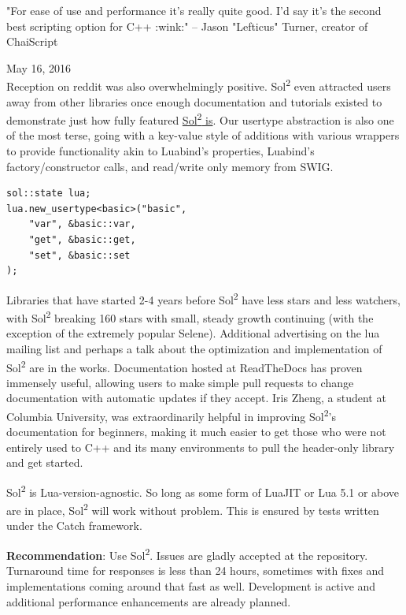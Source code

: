 \documentclass[conference,compsoc]{IEEEtran}
\newcommand{\soltwo}{Sol\textsuperscript{2}}
\begin{document}
\hfill "For ease of use and performance it's really quite good. I'd say it's the second best scripting option for C++ :wink:" -- Jason "Lefticus" Turner, creator of ChaiScript

\hfill May 16, 2016 \\

Reception on reddit was also overwhelmingly positive\cite{sol2-reddit}. \soltwo{} even attracted users away from other libraries once enough documentation and tutorials existed to demonstrate just how fully featured \href{https://github.com/ThePhD/sol2/issues/36\#issuecomment-199290974}{\soltwo{} is}. Our usertype abstraction is also one of the most terse, going with a key-value style of additions with various wrappers to provide functionality akin to Luabind's properties, Luabind's factory/constructor calls, and read/write only memory from SWIG.

\begin{lstlisting}[caption={\soltwo{} usertype example, performing the same binding for the \lstinline|basic| class as shown with many of the other libraries. Noticeably more terse.}, label={lst:sol-usertype}]
sol::state lua;
lua.new_usertype<basic>("basic",
	"var", &basic::var,
	"get", &basic::get,
	"set", &basic::set
);
\end{lstlisting}

Libraries that have started 2-4 years before \soltwo{} have less stars and less watchers, with \soltwo{} breaking 160 stars with small, steady growth continuing (with the exception of the extremely popular Selene). Additional advertising on the lua mailing list and perhaps a talk about the optimization and implementation of \soltwo{} are in the works. Documentation hosted at ReadTheDocs\cite{readthedocs} has proven immensely useful, allowing users to make simple pull requests to change documentation with automatic updates if they accept. Iris Zheng, a student at Columbia University, was extraordinarily helpful in improving \soltwo{}'s documentation for beginners, making it much easier to get those who were not entirely used to C++ and its many environments to pull the header-only library and get started.

\soltwo{} is Lua-version-agnostic. So long as some form of LuaJIT or Lua 5.1 or above are in place, \soltwo{} will work without problem. This is ensured by tests written under the Catch\cite{catch} framework.

\textbf{Recommendation}: Use \soltwo{}. Issues are gladly accepted at the repository. Turnaround time for responses is less than 24 hours, sometimes with fixes and implementations coming around that fast as well. Development is active and additional performance enhancements are already planned.
\end{document}
